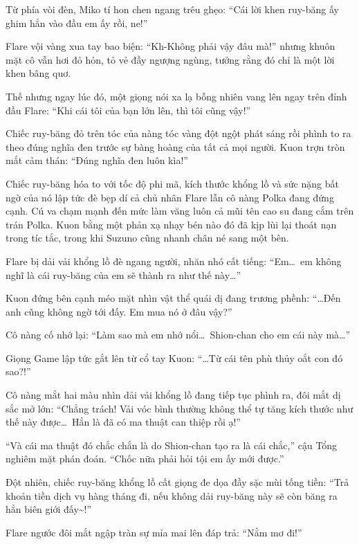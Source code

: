 \documentclass[../main.tex]{subfiles}
\begin{document}
Từ phía vòi đèn, Miko tí hon chen ngang trêu ghẹo: ``Cái lời khen ruy-băng ấy ghim hẳn vào đầu em ấy rồi, ne!''

Flare vội vàng xua tay bao biện: ``Kh-Không phải vậy đâu mà!'' nhưng khuôn mặt cô vẫn hơi đỏ hỏn, tỏ vẻ đầy ngượng ngùng, tưởng rằng đó chỉ là một lời khen bâng quơ.

Thế nhưng ngay lúc đó, một giọng nói xa lạ bỗng nhiên vang lên ngay trên đỉnh đầu Flare: ``Khi cái tôi của bạn lớn lên, thì tôi cũng vậy!''

Chiếc ruy-băng đỏ trên tóc của nàng tóc vàng đột ngột phát sáng rồi phình to ra theo đúng nghĩa đen trước sự bàng hoàng của tất cả mọi người. Kuon trợn tròn mắt cảm thán: ``Đúng nghĩa đen luôn kìa!''


Chiếc ruy-băng hóa to với tốc độ phi mã, kích thước khổng lồ và sức nặng bất ngờ của nó lập tức đè bẹp dí cả chủ nhân Flare lẫn cô nàng Polka đang đứng cạnh. Cú va chạm mạnh đến mức làm văng luôn cả mũi tên cao su đang cắm trên trán Polka. Kuon bằng một phản xạ nhạy bén nào đó đã kịp lùi lại thoát nạn trong tíc tắc, trong khi Suzuno cũng nhanh chân né sang một bên.

Flare bị dải vải khổng lồ đè ngang người, nhăn nhó cất tiếng: ``Em\dots\ em không nghĩ là cái ruy-băng của em sẽ thành ra như thế này\dots''

Kuon đứng bên cạnh méo mặt nhìn vật thể quái dị đang trương phềnh: ``\dots Đến anh cũng không ngờ tới đấy. Em mua nó ở đâu vậy?''

Cô nàng cố nhớ lại: ``Làm sao mà em nhớ nổi\dots\ Shion-chan cho em cái này mà\dots''

Giọng Game lập tức gắt lên từ cổ tay Kuon: ``\dots Từ cái tên phù thủy oắt con đó sao?!''

Cô nàng mắt hai màu nhìn dải vải khổng lồ đang tiếp tục phình ra, đôi mắt dị sắc mở lớn: ``Chẳng trách! Vải vóc bình thường không thể tự tăng kích thước như thế này được\dots\ Hẳn là đã có ma thuật can thiệp rồi ạ!''

``Và cái ma thuật đó chắc chắn là do Shion-chan tạo ra là cái chắc,'' cậu Tổng nghiêm mặt phán đoán. ``Chốc nữa phải hỏi tội em ấy mới được.''

Đột nhiên, chiếc ruy-băng khổng lồ cất giọng đe dọa đầy sặc mùi tống tiền: ``Trả khoản tiền dịch vụ hàng tháng đi, nếu không dải ruy-băng này sẽ còn băng ra hẳn biên giới đấy\~{}!''

Flare ngước đôi mắt ngập tràn sự mỉa mai lên đáp trả: ``Nằm mơ đi!''
\end{document}
